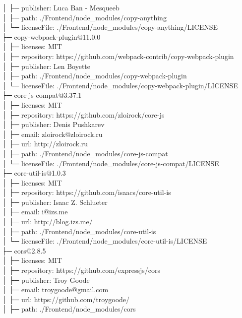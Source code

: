 │  ├─ publisher: Luca Ban - Mesqueeb\\
│  ├─ path: ./Frontend/node\_modules/copy-anything\\
│  └─ licenseFile: ./Frontend/node\_modules/copy-anything/LICENSE\\
├─ copy-webpack-plugin@11.0.0\\
│  ├─ licenses: MIT\\
│  ├─ repository: https://github.com/webpack-contrib/copy-webpack-plugin\\
│  ├─ publisher: Len Boyette\\
│  ├─ path: ./Frontend/node\_modules/copy-webpack-plugin\\
│  └─ licenseFile: ./Frontend/node\_modules/copy-webpack-plugin/LICENSE\\
├─ core-js-compat@3.37.1\\
│  ├─ licenses: MIT\\
│  ├─ repository: https://github.com/zloirock/core-js\\
│  ├─ publisher: Denis Pushkarev\\
│  ├─ email: zloirock@zloirock.ru\\
│  ├─ url: http://zloirock.ru\\
│  ├─ path: ./Frontend/node\_modules/core-js-compat\\
│  └─ licenseFile: ./Frontend/node\_modules/core-js-compat/LICENSE\\
├─ core-util-is@1.0.3\\
│  ├─ licenses: MIT\\
│  ├─ repository: https://github.com/isaacs/core-util-is\\
│  ├─ publisher: Isaac Z. Schlueter\\
│  ├─ email: i@izs.me\\
│  ├─ url: http://blog.izs.me/\\
│  ├─ path: ./Frontend/node\_modules/core-util-is\\
│  └─ licenseFile: ./Frontend/node\_modules/core-util-is/LICENSE\\
├─ cors@2.8.5\\
│  ├─ licenses: MIT\\
│  ├─ repository: https://github.com/expressjs/cors\\
│  ├─ publisher: Troy Goode\\
│  ├─ email: troygoode@gmail.com\\
│  ├─ url: https://github.com/troygoode/\\
│  ├─ path: ./Frontend/node\_modules/cors\\
